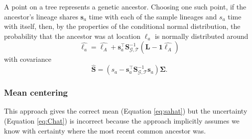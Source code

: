 \documentclass[12pt]{article}
\begin{document}
A point on a tree represents a genetic ancestor.
Choosing one such point, if the ancestor's lineage shares $\mathbf{s}_a$ time with each of the sample lineages and $s_a$ time with itself, then, by the properties of the conditional normal distribution, the probability that the ancestor was at location $\bm{\ell}_a$ is normally distributed
around
%
\begin{equation}\label{eq:sahat}
\widehat{\bm{\ell}_a} = \widehat{\bm{\ell}_A} + \mathbf{s}_a^\intercal \mathbf{S}_{\mathcal{G},\mathcal{T}}^{-1} (\mathbf{L} - \mathbf{1}\widehat{\bm{\ell}_A})
\end{equation}
%
with covariance
%
\begin{equation}\label{eq:Chat}
\widehat{\mathbf{S}} = (s_a - \mathbf{s}_a^\intercal \mathbf{S}_{\mathcal{G},\mathcal{T}}^{-1} \mathbf{s}_a)\mathbf{\Sigma}.
\end{equation}
%

\subsubsection*{Mean centering}

This approach gives the correct mean (Equation \eqref{eq:sahat}) but the uncertainty (Equation \eqref{eq:Chat}) is incorrect because the approach implicitly assumes we know with certainty where the most recent common ancestor was.
\end{document}
